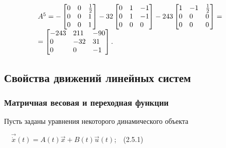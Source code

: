 \documentclass[a4paper]{article}
\begin{document}
\begin{equation*}
\begin{matrix}A^5=-\left[\begin{matrix}0\hfill\null &0\hfill\null &\frac 1 2\hfill\null \\0\hfill\null &0\hfill\null
&1\hfill\null \\0\hfill\null &0\hfill\null &1\hfill\null \end{matrix}\right]-32\left[\begin{matrix}0\hfill\null
&1\hfill\null &-1\hfill\null \\0\hfill\null &1\hfill\null &-1\hfill\null \\0\hfill\null &0\hfill\null &0\hfill\null
\end{matrix}\right]-243\left[\begin{matrix}1\hfill\null &-1\hfill\null &\frac 1 2\hfill\null \\0\hfill\null
&0\hfill\null &0\hfill\null \\0\hfill\null &0\hfill\null &0\hfill\null \end{matrix}\right]=\hfill\null
\\=\left[\begin{matrix}-243\hfill\null &211\hfill\null &-90\hfill\null \\0\hfill\null &-32\hfill\null &31\hfill\null
\\0\hfill\null &0\hfill\null &-1\hfill\null \end{matrix}\right].\hfill\null \end{matrix}\hfill 
\end{equation*}
\subsection{Свойства движений линейных систем}
\hypertarget{RefHeadingToc455659705}{}\subsubsection{Матричная весовая и переходная функции}
\hypertarget{RefHeadingToc455659706}{}
\bigskip

{\begin{russian}\sffamily
Пусть заданы уравнения некоторого динамического объекта
\end{russian}}

{\begin{russian}\sffamily
\ \  $\vec{\dot x}(t)=A(t)\vec x+B(t)\vec u(t)$;\ \ (2.5.1)
\end{russian}}
\end{document}
